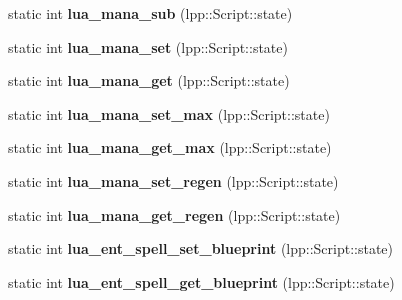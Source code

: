 \begin{DoxyCompactItemize}
\item 
static int {\bfseries lua\+\_\+mana\+\_\+sub} (lpp\+::\+Script\+::state)\hypertarget{class_lua_interface_a18c5cd03731a800b25954cdba42c48de}{}\label{class_lua_interface_a18c5cd03731a800b25954cdba42c48de}

\item 
static int {\bfseries lua\+\_\+mana\+\_\+set} (lpp\+::\+Script\+::state)\hypertarget{class_lua_interface_abc1a441c3420471383bbb755c2dd3bb2}{}\label{class_lua_interface_abc1a441c3420471383bbb755c2dd3bb2}

\item 
static int {\bfseries lua\+\_\+mana\+\_\+get} (lpp\+::\+Script\+::state)\hypertarget{class_lua_interface_a7b62b7011f1cc6ca48e5a93650753bd8}{}\label{class_lua_interface_a7b62b7011f1cc6ca48e5a93650753bd8}

\item 
static int {\bfseries lua\+\_\+mana\+\_\+set\+\_\+max} (lpp\+::\+Script\+::state)\hypertarget{class_lua_interface_a63b5aa3556139155f14872db6e28b7b7}{}\label{class_lua_interface_a63b5aa3556139155f14872db6e28b7b7}

\item 
static int {\bfseries lua\+\_\+mana\+\_\+get\+\_\+max} (lpp\+::\+Script\+::state)\hypertarget{class_lua_interface_a26301028c9fd888d977f83e484e80deb}{}\label{class_lua_interface_a26301028c9fd888d977f83e484e80deb}

\item 
static int {\bfseries lua\+\_\+mana\+\_\+set\+\_\+regen} (lpp\+::\+Script\+::state)\hypertarget{class_lua_interface_a5edbdc0c95ee8a421db1d155e7577fc5}{}\label{class_lua_interface_a5edbdc0c95ee8a421db1d155e7577fc5}

\item 
static int {\bfseries lua\+\_\+mana\+\_\+get\+\_\+regen} (lpp\+::\+Script\+::state)\hypertarget{class_lua_interface_afd51960dd4c5bb29dce7d3998b20588f}{}\label{class_lua_interface_afd51960dd4c5bb29dce7d3998b20588f}

\item 
static int {\bfseries lua\+\_\+ent\+\_\+spell\+\_\+set\+\_\+blueprint} (lpp\+::\+Script\+::state)\hypertarget{class_lua_interface_a287f6429d21817a7eba610c6a0b9675f}{}\label{class_lua_interface_a287f6429d21817a7eba610c6a0b9675f}

\item 
static int {\bfseries lua\+\_\+ent\+\_\+spell\+\_\+get\+\_\+blueprint} (lpp\+::\+Script\+::state)\hypertarget{class_lua_interface_a3f70412b7383826e418ec7aab82ff6ac}{}\label{class_lua_interface_a3f70412b7383826e418ec7aab82ff6ac}


\end{DoxyCompactItemize}
